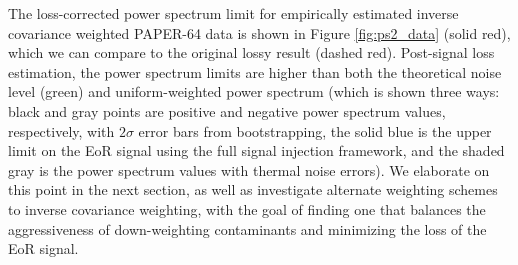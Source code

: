 \documentclass[preprint2,numberedappendix,tighten]{aastex6}  %
\newcommand{\cc}[1]{{\color{purple} \textbf{[CC: #1]}}}
\begin{document}
%


The loss-corrected power spectrum limit for empirically estimated inverse covariance weighted PAPER-64 data is shown in Figure \ref{fig:ps2_data} (solid red), which we can compare to the original lossy result (dashed red). %
Post-signal loss estimation, the power spectrum limits are higher than both the theoretical noise level (green) and uniform-weighted power spectrum (which is shown three ways: black and gray points are positive and negative power spectrum values, respectively, with $2\sigma$ error bars from bootstrapping, the solid blue is the upper limit on the EoR signal using the full signal injection framework, and the shaded gray is the power spectrum values with thermal noise errors). We elaborate on this point in the next section, as well as investigate alternate 
weighting schemes to inverse covariance weighting, with the goal of finding one that balances the aggressiveness of down-weighting contaminants and minimizing the loss of the EoR signal. 
\end{document}
